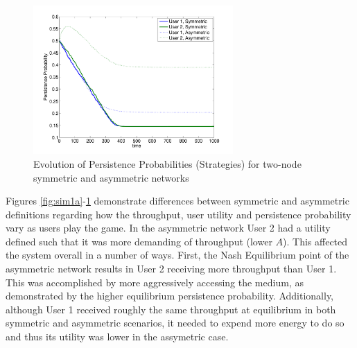 \documentclass[conference]{IEEEtran}
\theoremstyle{definition}
\begin{document}
\begin{figure}[htp]
\begin{center}
\includegraphics[width=3in]{sim1c.pdf}
\caption{Evolution of Persistence Probabilities (Strategies) for two-node symmetric and asymmetric networks}
\label{fig:sim1c}
\end{center}
\end{figure}
Figures \ref{fig:sim1a}-\ref{fig:sim1c} demonstrate differences between symmetric and asymmetric definitions regarding how the throughput, user utility and persistence probability vary as users play the game. In the asymmetric network User 2 had a utility defined such that it was more demanding of throughput (lower $A$). This affected the system overall in a number of ways. First, the Nash Equilibrium point of the asymmetric network results in User 2 receiving more throughput than User 1. This was accomplished by more aggressively accessing the medium, as demonstrated by the higher equilibrium persistence probability. Additionally, although User 1 received roughly the same throughput at equilibrium in both symmetric and asymmetric scenarios, it needed to expend more energy to do so and thus its utility was lower in the assymetric case.
\end{document}
